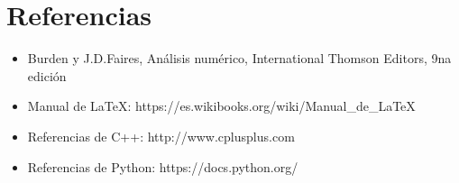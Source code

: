 \section{Referencias}

\begin{itemize}
\item Burden y J.D.Faires, Análisis numérico, International Thomson Editors, 9na edición
\item Manual de LaTeX: https://es.wikibooks.org/wiki/Manual_de_LaTeX
\item Referencias de C++: http://www.cplusplus.com
\item Referencias de Python: https://docs.python.org/
\end{itemize}